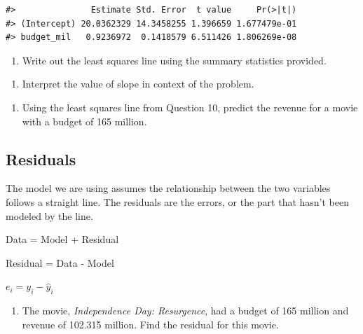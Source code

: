 \documentclass[
]{report}
\providecommand{\tightlist}{%
  \setlength{\itemsep}{0pt}\setlength{\parskip}{0pt}}
\begin{document}
\begin{verbatim}
#>               Estimate Std. Error  t value     Pr(>|t|)
#> (Intercept) 20.0362329 14.3458255 1.396659 1.677479e-01
#> budget_mil   0.9236972  0.1418579 6.511426 1.806269e-08
\end{verbatim}

\begin{enumerate}
\def\labelenumi{\arabic{enumi}.}
\setcounter{enumi}{9}
\tightlist
\item
  Write out the least squares line using the summary statistics provided.
\end{enumerate}

\vspace{1in}

\begin{enumerate}
\def\labelenumi{\arabic{enumi}.}
\setcounter{enumi}{10}
\tightlist
\item
  Interpret the value of slope in context of the problem.
\end{enumerate}

\vspace{1in}

\begin{enumerate}
\def\labelenumi{\arabic{enumi}.}
\setcounter{enumi}{11}
\tightlist
\item
  Using the least squares line from Question 10, predict the revenue for a movie with a budget of 165 million.
\end{enumerate}

\vspace{1in}

\hypertarget{residuals}{%
\subsection{Residuals}\label{residuals}}

The model we are using assumes the relationship between the two variables follows a straight line. The residuals are the errors, or the part that hasn't been modeled by the line.

\begin{center}
Data = Model + Residual

Residual = Data - Model

$e_i=y_i-\hat{y}_i$
\end{center}

\begin{enumerate}
\def\labelenumi{\arabic{enumi}.}
\setcounter{enumi}{12}
\tightlist
\item
  The movie, \emph{Independence Day: Resurgence}, had a budget of 165 million and revenue of 102.315 million. Find the residual for this movie.
\end{enumerate}
\end{document}
